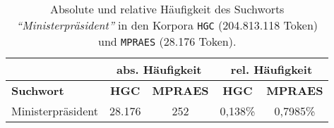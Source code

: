 \documentclass[%
	type=document,%
  	style=article,%
  	media=print,
  	pages=oneside,%
  	prefixLecturer=Dozenten:,
  	author=multiple,
]{unihildesheim} %
\begin{document}
\begin{table}[htpb]\label{t}
	\center
	\begin{tabularx}{0.8\textwidth}{lcccc}
		\toprule
		& \multicolumn{2}{c}{\textbf{abs. Häufigkeit}} &
		\multicolumn{2}{c}{\textbf{rel. Häufigkeit}} \\
		\midrule
		\textbf{Suchwort} & \textbf{HGC} & \textbf{MPRAES} & \textbf{HGC}
		&	\textbf{MPRAES} \\
		\midrule
		Ministerpräsident & 28.176 & 252 & 0,138\% & 0,7985\% \\
		\bottomrule
	\end{tabularx}
	\caption{Absolute und relative Häufigkeit des Suchworts \textit{"`Ministerpräsident"'} in
	den Korpora \texttt{HGC} (204.813.118 Token) und \texttt{MPRAES} (28.176 Token).}
	\label{tab:corp_frequency}
\end{table}
\end{document}
